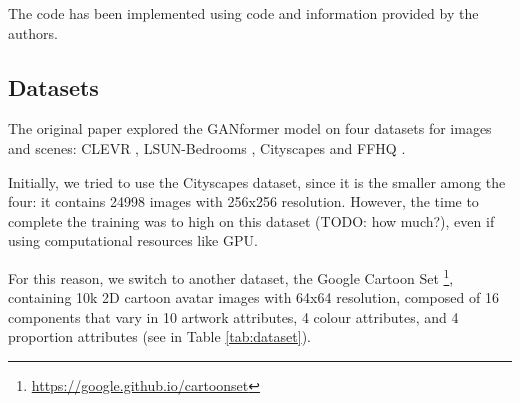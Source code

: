\documentclass{article}
\begin{document}
	The code has been implemented using code and information provided by the authors.
	
	\subsection{Datasets}	
	The original paper \cite{hudson2021generative} explored the GANformer model on four datasets for 
	images and scenes: CLEVR \cite{johnson2017clevr}, LSUN-Bedrooms \cite{yu2015lsun}, Cityscapes 
	\cite{cordts2016cityscapes} and FFHQ \cite{karras2019style}. 
	
	Initially, we tried to use the Cityscapes dataset, since it is the smaller among the four: it contains 
	24998 images with 256x256 resolution. 
	However, the time to complete the training was to high on this dataset (TODO: how much?), even if 
	using computational resources like GPU.
	
	For this reason, we switch to another dataset, the Google Cartoon Set \cite{cartoonset}\footnote{	
	\url{https://google.github.io/cartoonset}}, containing 10k 2D cartoon avatar 
	images with 64x64 resolution, composed of 16 components that vary in 10 artwork attributes, 4 
	colour attributes, and 4 proportion attributes (see in Table \ref{tab:dataset}). 
\end{document}
